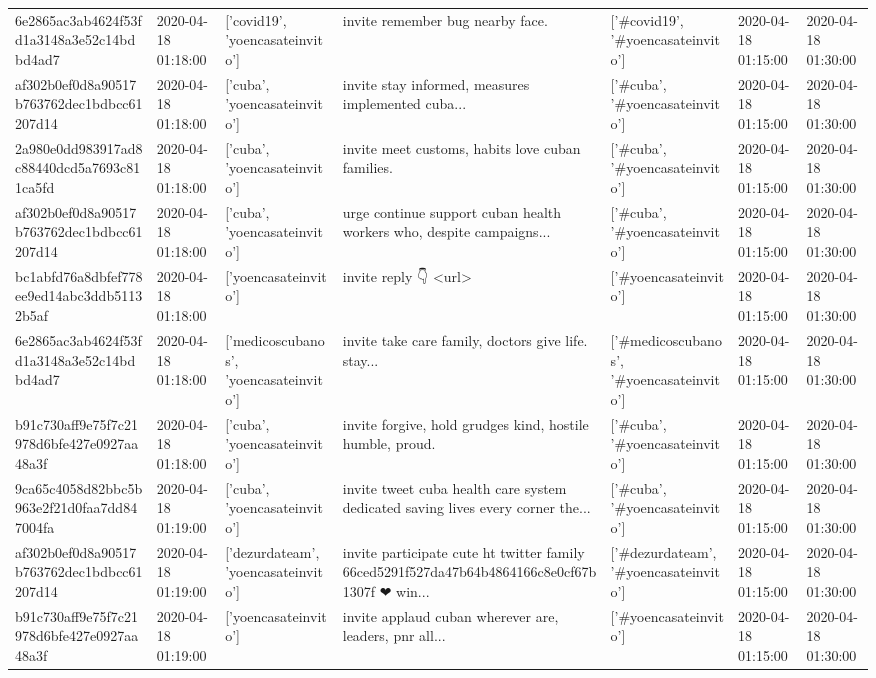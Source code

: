 \begin{tabular}{lllllll}
6e2865ac3ab4624f53fd1a3148a3e52c14bdbd4ad7 & 2020-04-18 01:18:00 & ['covid19', 'yoencasateinvito'] & invite remember bug nearby face. & ['#covid19', '#yoencasateinvito'] & 2020-04-18 01:15:00 & 2020-04-18 01:30:00 \\
af302b0ef0d8a90517b763762dec1bdbcc61207d14 & 2020-04-18 01:18:00 & ['cuba', 'yoencasateinvito'] & invite stay informed, measures implemented cuba... & ['#cuba', '#yoencasateinvito'] & 2020-04-18 01:15:00 & 2020-04-18 01:30:00 \\
2a980e0dd983917ad8c88440dcd5a7693c811ca5fd & 2020-04-18 01:18:00 & ['cuba', 'yoencasateinvito'] & invite meet customs, habits love cuban families. & ['#cuba', '#yoencasateinvito'] & 2020-04-18 01:15:00 & 2020-04-18 01:30:00 \\
af302b0ef0d8a90517b763762dec1bdbcc61207d14 & 2020-04-18 01:18:00 & ['cuba', 'yoencasateinvito'] & urge continue support cuban health workers who, despite campaigns... & ['#cuba', '#yoencasateinvito'] & 2020-04-18 01:15:00 & 2020-04-18 01:30:00 \\
bc1abfd76a8dbfef778ee9ed14abc3ddb51132b5af & 2020-04-18 01:18:00 & ['yoencasateinvito'] & invite reply 👇 <url> & ['#yoencasateinvito'] & 2020-04-18 01:15:00 & 2020-04-18 01:30:00 \\
6e2865ac3ab4624f53fd1a3148a3e52c14bdbd4ad7 & 2020-04-18 01:18:00 & ['medicoscubanos', 'yoencasateinvito'] & invite take care family, doctors give life. stay... & ['#medicoscubanos', '#yoencasateinvito'] & 2020-04-18 01:15:00 & 2020-04-18 01:30:00 \\
b91c730aff9e75f7c21978d6bfe427e0927aa48a3f & 2020-04-18 01:18:00 & ['cuba', 'yoencasateinvito'] & invite forgive, hold grudges kind, hostile humble, proud. & ['#cuba', '#yoencasateinvito'] & 2020-04-18 01:15:00 & 2020-04-18 01:30:00 \\
9ca65c4058d82bbc5b963e2f21d0faa7dd847004fa & 2020-04-18 01:19:00 & ['cuba', 'yoencasateinvito'] & invite tweet cuba health care system dedicated saving lives every corner the... & ['#cuba', '#yoencasateinvito'] & 2020-04-18 01:15:00 & 2020-04-18 01:30:00 \\
af302b0ef0d8a90517b763762dec1bdbcc61207d14 & 2020-04-18 01:19:00 & ['dezurdateam', 'yoencasateinvito'] & invite participate cute ht twitter family 66ced5291f527da47b64b4864166c8e0cf67b1307f ❤ win... & ['#dezurdateam', '#yoencasateinvito'] & 2020-04-18 01:15:00 & 2020-04-18 01:30:00 \\
b91c730aff9e75f7c21978d6bfe427e0927aa48a3f & 2020-04-18 01:19:00 & ['yoencasateinvito'] & invite applaud cuban wherever are, leaders, pnr all... & ['#yoencasateinvito'] & 2020-04-18 01:15:00 & 2020-04-18 01:30:00 \\

\end{tabular}
